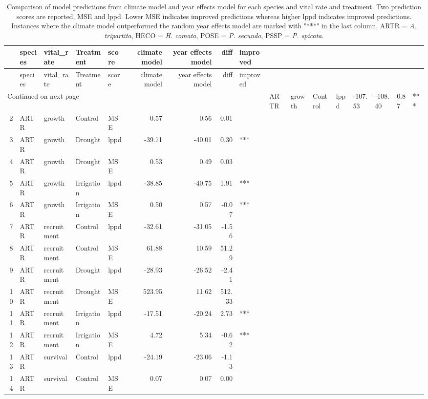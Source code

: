 \begin{longtable}{rllllrrrl}
\caption{Comparison of model predictions from climate model and year effects model for each species and vital rate and treatment.  Two prediction scores are reported, MSE and lppd. Lower MSE indicates improved predictions whereas higher lppd indicates improved predictions.  Instances where the climate model outperformed the random year effects model are marked with "***" in the last column. ARTR = \textit{A. tripartita}, HECO = \textit{H. comata}, POSE = \textit{P. secunda}, PSSP = \textit{P. spicata}.} \\ 
  \hline
 & species & vital\_rate & Treatment & score & climate model & year effects model & diff & improved \\ 
  \hline
\endfirsthead
  \hline
& species & vital\_rate & Treatment & score & climate model & year effects model & diff & improved \\ 
\endhead
\hline
\multicolumn{9}{l}{\footnotesize Continued on next page}
\endfoot
\endlastfoot
1 & ARTR & growth & Control & lppd & -107.53 & -108.40 & 0.87 & *** \\ 
  2 & ARTR & growth & Control & MSE & 0.57 & 0.56 & 0.01 &  \\ 
  3 & ARTR & growth & Drought & lppd & -39.71 & -40.01 & 0.30 & *** \\ 
  4 & ARTR & growth & Drought & MSE & 0.53 & 0.49 & 0.03 &  \\ 
  5 & ARTR & growth & Irrigation & lppd & -38.85 & -40.75 & 1.91 & *** \\ 
  6 & ARTR & growth & Irrigation & MSE & 0.50 & 0.57 & -0.07 & *** \\ 
  7 & ARTR & recruitment & Control & lppd & -32.61 & -31.05 & -1.56 &  \\ 
  8 & ARTR & recruitment & Control & MSE & 61.88 & 10.59 & 51.29 &  \\ 
  9 & ARTR & recruitment & Drought & lppd & -28.93 & -26.52 & -2.41 &  \\ 
  10 & ARTR & recruitment & Drought & MSE & 523.95 & 11.62 & 512.33 &  \\ 
  11 & ARTR & recruitment & Irrigation & lppd & -17.51 & -20.24 & 2.73 & *** \\ 
  12 & ARTR & recruitment & Irrigation & MSE & 4.72 & 5.34 & -0.62 & *** \\ 
  13 & ARTR & survival & Control & lppd & -24.19 & -23.06 & -1.13 &  \\ 
  14 & ARTR & survival & Control & MSE & 0.07 & 0.07 & 0.00 &  \\ 

\end{longtable}
